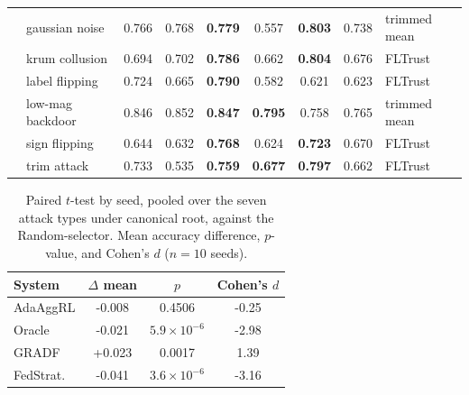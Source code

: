 \begin{table}[t]
\begin{tabular}{llccccccl}
 & gaussian noise & 0.766 & 0.768 & \textbf{0.779} & 0.557 & \textbf{0.803} & 0.738 & trimmed mean \\
 & krum collusion & 0.694 & 0.702 & \textbf{0.786} & 0.662 & \textbf{0.804} & 0.676 & FLTrust \\
 & label flipping & 0.724 & 0.665 & \textbf{0.790} & 0.582 & 0.621 & 0.623 & FLTrust \\
 & low-mag backdoor & 0.846 & 0.852 & \textbf{0.847} & \textbf{0.795} & 0.758 & 0.765 & trimmed mean \\
 & sign flipping & 0.644 & 0.632 & \textbf{0.768} & 0.624 & \textbf{0.723} & 0.670 & FLTrust \\
 & trim attack & 0.733 & 0.535 & \textbf{0.759} & \textbf{0.677} & \textbf{0.797} & 0.662 & FLTrust \\
\bottomrule
\end{tabular}
\end{table}

\begin{table}[t]
\centering
\caption{Paired $t$-test by seed, pooled over the seven attack types under canonical root, against the Random-selector. Mean accuracy difference, $p$-value, and Cohen's $d$ ($n=10$ seeds).}
\label{tab:pooled-vs-random}
\begin{tabular}{lccc}
\toprule
System & $\Delta$ mean & $p$ & Cohen's $d$ \\
\midrule
AdaAggRL & -0.008 & 0.4506 & -0.25 \\
Oracle & -0.021 & $5.9\times10^{-6}$ & -2.98 \\
GRADF & +0.023 & 0.0017 & 1.39 \\
FedStrat. & -0.041 & $3.6\times10^{-6}$ & -3.16 \\
\bottomrule
\end{tabular}
\end{table}

